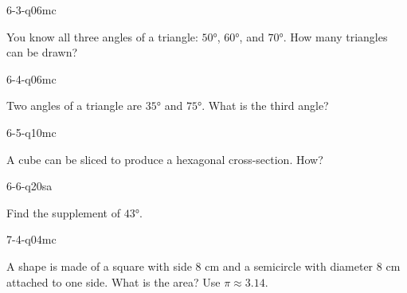 \begin{practiceQuestion}{6-3-q06}{mc}
\begin{questionText}
You know all three angles of a triangle: $50°$, $60°$, and $70°$. How many triangles can be drawn?
\end{questionText}
\end{practiceQuestion}

\begin{practiceQuestion}{6-4-q06}{mc}
\begin{questionText}
Two angles of a triangle are $35°$ and $75°$. What is the third angle?
\end{questionText}
\end{practiceQuestion}

\begin{practiceQuestion}{6-5-q10}{mc}
\begin{questionText}
A cube can be sliced to produce a hexagonal cross-section. How?
\end{questionText}
\end{practiceQuestion}

\begin{practiceQuestion}{6-6-q20}{sa}
\begin{questionText}
Find the supplement of $43°$.
\end{questionText}
\end{practiceQuestion}

\begin{practiceQuestion}{7-4-q04}{mc}
\begin{questionText}
A shape is made of a square with side $8$ cm and a semicircle with diameter $8$ cm attached to one side. What is the area? Use $\pi \approx 3.14$.
\end{questionText}
\end{practiceQuestion}

